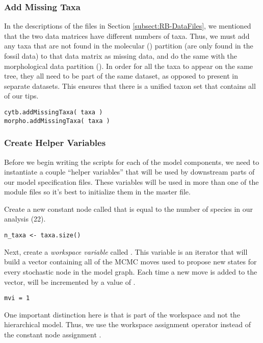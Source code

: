  

\medskip
\subsubsection{Add Missing Taxa}\label{subsub:RB-AddMissing}

In the descriptions of the files in Section \ref{subsect:RB-DataFiles}, we mentioned that the two data matrices have different numbers of taxa. 
Thus, we must add any taxa that are not found in the molecular () partition (\IE are only found in the fossil data) to that data matrix as missing data, and do the same with the morphological data partition ().
In order for all the taxa to appear on the same tree, they all need to be part of the same dataset, as opposed to present in separate datasets. 
This ensures that there is a unified taxon set that contains all of our tips.
{\tt \begin{snugshade*}
\begin{lstlisting}
cytb.addMissingTaxa( taxa )
morpho.addMissingTaxa( taxa )
\end{lstlisting}
\end{snugshade*}}


\medskip
\subsubsection{Create Helper Variables}\label{subsub:RB-mviVar}

Before we begin writing the \Rev scripts for each of the model components, we need to instantiate a couple ``helper variables'' that will be used by downstream parts of our model specification files. 
These variables will be used in more than one of the module files so it's best to initialize them in the master file.

Create a new constant node called  that is equal to the number of species in our analysis (22). 
{\tt \begin{snugshade*}
\begin{lstlisting}
n_taxa <- taxa.size() 
\end{lstlisting}
\end{snugshade*}}

Next, create a \textit{workspace variable} called . 
This variable is an iterator that will build a vector containing all of the MCMC moves used to propose new states for every stochastic node in the model graph. 
Each time a new move is added to the vector,  will be incremented by a value of .
{\tt \begin{snugshade*}
\begin{lstlisting}
mvi = 1
\end{lstlisting}
\end{snugshade*}}
One important distinction here is that  is part of the \RevBayes workspace and not the hierarchical model. 
Thus, we use the workspace assignment operator \cl{=} instead of the constant node assignment \cl{<-}. 

